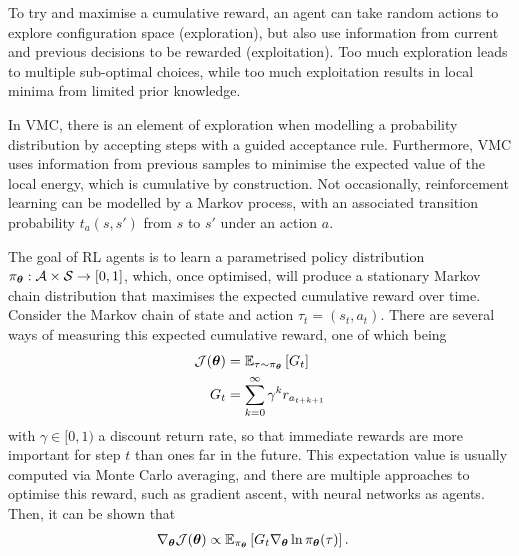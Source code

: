 To try and maximise a cumulative reward, an agent can take random actions to explore configuration space (exploration), but also use information from current and previous decisions to be rewarded (exploitation). Too much exploration leads to multiple sub-optimal choices, while too much exploitation results in local minima from limited prior knowledge.

In VMC, there is an element of exploration when modelling a probability distribution by accepting steps with a guided acceptance rule. Furthermore, VMC uses information from previous samples to minimise the expected value of the local energy, which is cumulative by construction. Not occasionally, reinforcement learning can be modelled by a Markov process, with an associated transition probability $t_a(s, s')$ from $s$ to $s'$ under an action $a$.

The goal of RL agents is to learn a parametrised policy distribution $\pi_{\boldsymbol{\theta}}: \mathcal{A} \times \mathcal{S} \to [0,1]$, which, once optimised, will produce a stationary Markov chain distribution that maximises the expected cumulative reward over time. Consider the Markov chain of state and action $\tau_t = (s_t, a_t)$. There are several ways of measuring this expected cumulative reward, one of which being
\begin{align*}
    \mathcal{J}(\boldsymbol{\theta})&= \mathbb{E}_{\tau \sim \pi_{\boldsymbol{\theta}}} \left[G_t\right] \\
    G_t &= \sum_{k=0}^\infty \gamma^k r_{a_{t+ k + 1}}
\end{align*}
with $\gamma \in [0, 1)$ a discount return rate, so that immediate rewards are more important for step $t$ than ones far in the future. This expectation value is usually computed via Monte Carlo averaging, and there are multiple approaches to optimise this reward, such as gradient ascent, with neural networks as agents. Then, it can be shown \cite{sutton2018reinforcement} that
\begin{align*}
    \nabla_{\boldsymbol{\theta}} \mathcal{J}({\boldsymbol{\theta}})&\propto \mathbb{E}_{\pi_{\boldsymbol{\theta}}} \left[G_t\nabla_{\boldsymbol{\theta}}\ln\pi_{\boldsymbol{\theta}}(\tau)\right].
\end{align*}

